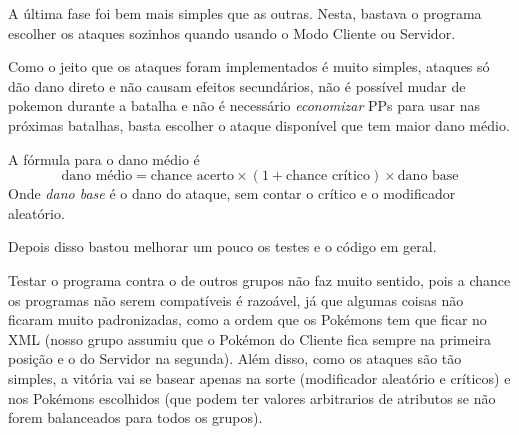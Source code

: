 \documentclass[a4paper]{article}
\begin{document}
A última fase foi bem mais simples que as outras. Nesta, bastava o programa
escolher os ataques sozinhos quando usando o Modo Cliente ou Servidor.

Como o jeito que os ataques foram implementados é muito simples, ataques só
dão dano direto e não causam efeitos secundários, não é possível mudar de
pokemon durante a batalha e não é necessário \emph{economizar} PPs para usar
nas próximas batalhas, basta escolher o ataque disponível que tem maior dano
médio.

A fórmula para o dano médio é
$$ \text{dano médio} = \text{chance acerto} \times (1 + \text{chance crítico}) \times \text{dano base} $$
Onde \emph{dano base} é o dano do ataque, sem contar o crítico e o modificador aleatório.

Depois disso bastou melhorar um pouco os testes e o código em geral.

Testar o programa contra o de outros grupos não faz muito sentido, pois a chance
os programas não serem compatíveis é razoável, já que algumas coisas não ficaram
muito padronizadas, como a ordem que os Pokémons tem que ficar no XML (nosso grupo
assumiu que o Pokémon do Cliente fica sempre na primeira posição e o do Servidor na
segunda). Além disso, como os ataques são tão simples, a vitória vai se basear apenas
na sorte (modificador aleatório e críticos) e nos Pokémons escolhidos (que podem
ter valores arbitrarios de atributos se não forem balanceados para todos os grupos).
\end{document}
